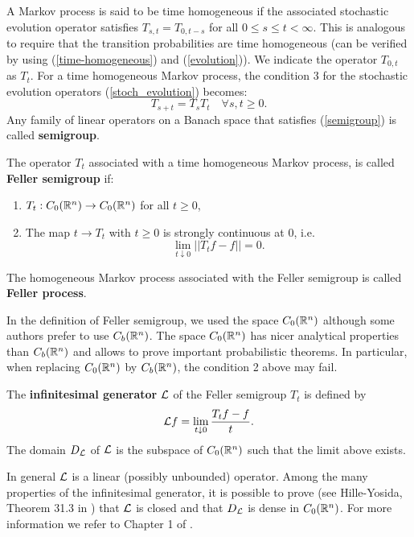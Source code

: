 \noindent
A Markov process is said to be time homogeneous if the associated stochastic evolution operator satisfies $T_{s,t} = T_{0,t-s}$ for all $0 \leq s \leq t < \infty$.
This is analogous to require that the transition probabilities are time homogeneous 
(can be verified by using (\ref{time-homogeneous}) and (\ref{evolution})). 
We indicate the operator $T_{0,t}$ as $T_t$. For a time homogeneous Markov process, the condition 3 for the stochastic evolution operators (\ref{stoch_evolution}) becomes:
\begin{equation}\label{semigroup}
 T_{s+t} = T_s T_t  \quad \forall s,t \geq 0. 
\end{equation}
Any family of linear operators on a Banach space that satisfies (\ref{semigroup}) is called \textbf{semigroup}.

\begin{Definition}
The operator $T_t$ associated with a time homogeneous Markov process, is called \textbf{Feller semigroup} if:
\begin{enumerate}
 \item $T_t : C_0(\mathbb{R}^n) \to C_0(\mathbb{R}^n) $ for all $t \geq 0$,
 \item The map $t \to T_t $ with $t \geq 0$ is strongly continuous at 0, i.e. $$\lim_{t \downarrow 0} ||T_t f - f|| = 0.$$ 
\end{enumerate} 
\end{Definition}
The homogeneous Markov process associated with the Feller semigroup is called \textbf{Feller process}.

In the definition of Feller semigroup, we used the space $C_0(\mathbb{R}^n)$ although some authors prefer to use $C_b(\mathbb{R}^n)$. 
The space $C_0(\mathbb{R}^n)$ has nicer analytical properties than $C_b(\mathbb{R}^n)$ and allows to prove important probabilistic theorems.
In particular, when replacing $C_0(\mathbb{R}^n)$ by $C_b(\mathbb{R}^n)$, the condition 2 above may fail.

\begin{Definition}
The \textbf{infinitesimal generator} $\mathcal{L}$ of the Feller semigroup $T_t$ is defined by
\begin{equation}
 \mathcal{L} f =  \lim_{t \downarrow 0} \frac{T_t f - f}{t}.  
\end{equation}
The domain $D_{\mathcal{L}}$ of $\mathcal{L}$ is the subspace of $C_0(\mathbb{R}^n)$ such that the limit above exists. 
\end{Definition}
In general $\mathcal{L}$ is a linear (possibly unbounded) operator.
Among the many properties of the infinitesimal generator, it is possible to prove (see Hille-Yosida, Theorem 31.3 in \cite{Sato}) 
that $\mathcal{L}$ is closed and that $D_{\mathcal{L}}$ is dense in $C_0(\mathbb{R}^n)$.   
For more information we refer to Chapter 1 of \cite{EthierKurtz}.


